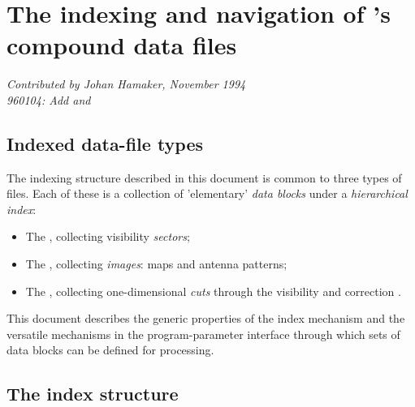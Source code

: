 %
%
%
\newcommand{\bi}{ \begin{itemize} }
\newcommand{\ei}{ \end{itemize} }
\newcommand{\bn}{ \begin{enumerate} }
\newcommand{\en}{ \end{enumerate} }
\newcommand{\eg}{ {\em e.g. } }

\chapter{ The indexing and navigation of \NEWSTAR's compound data files }

{\par \em Contributed by Johan Hamaker, November 1994 \\
	960104: Add 
		and 
\centering \par}

\tableofcontents

\section{ Indexed data-file types }
\label{.file.types}

	The indexing structure described in this document is common to three types of \NEWSTAR files. Each of these is a collection of 'elementary' {\em data blocks} under a {\em hierarchical index}:

\bi
\item   The , collecting visibility {\em sectors};

\item   The , collecting {\em images}: maps and antenna patterns;

\item   The , collecting one-dimensional {\em cuts} through the visibility and correction
.
\ei

	This document describes the generic properties of the index mechanism and the versatile mechanisms in the \NEWSTAR program-parameter interface through which sets of data blocks can be defined for processing.


\section{ The index structure }
\label{.index.structure}

